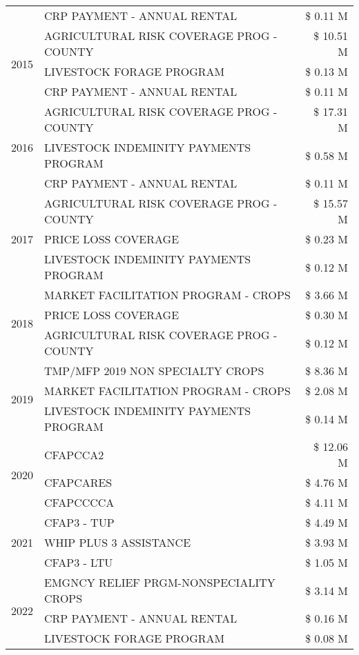 \begin{tabular}{llr}
 & CRP PAYMENT - ANNUAL RENTAL & \$ 0.11 M \\
\cline{1-3}
\multirow[t]{3}{*}{2015} & AGRICULTURAL RISK COVERAGE PROG - COUNTY & \$ 10.51 M \\
 & LIVESTOCK FORAGE PROGRAM & \$ 0.13 M \\
 & CRP PAYMENT - ANNUAL RENTAL & \$ 0.11 M \\
\cline{1-3}
\multirow[t]{3}{*}{2016} & AGRICULTURAL RISK COVERAGE PROG - COUNTY & \$ 17.31 M \\
 & LIVESTOCK INDEMINITY PAYMENTS PROGRAM & \$ 0.58 M \\
 & CRP PAYMENT - ANNUAL RENTAL & \$ 0.11 M \\
\cline{1-3}
\multirow[t]{3}{*}{2017} & AGRICULTURAL RISK COVERAGE PROG - COUNTY & \$ 15.57 M \\
 & PRICE LOSS COVERAGE & \$ 0.23 M \\
 & LIVESTOCK INDEMINITY PAYMENTS PROGRAM & \$ 0.12 M \\
\cline{1-3}
\multirow[t]{3}{*}{2018} & MARKET FACILITATION PROGRAM - CROPS & \$ 3.66 M \\
 & PRICE LOSS COVERAGE & \$ 0.30 M \\
 & AGRICULTURAL RISK COVERAGE PROG - COUNTY & \$ 0.12 M \\
\cline{1-3}
\multirow[t]{3}{*}{2019} & TMP/MFP 2019 NON SPECIALTY CROPS & \$ 8.36 M \\
 & MARKET FACILITATION PROGRAM - CROPS & \$ 2.08 M \\
 & LIVESTOCK INDEMINITY PAYMENTS PROGRAM & \$ 0.14 M \\
\cline{1-3}
\multirow[t]{3}{*}{2020} & CFAPCCA2 & \$ 12.06 M \\
 & CFAPCARES & \$ 4.76 M \\
 & CFAPCCCCA & \$ 4.11 M \\
\cline{1-3}
\multirow[t]{3}{*}{2021} & CFAP3 - TUP & \$ 4.49 M \\
 & WHIP PLUS 3 ASSISTANCE & \$ 3.93 M \\
 & CFAP3 - LTU & \$ 1.05 M \\
\cline{1-3}
\multirow[t]{3}{*}{2022} & EMGNCY RELIEF PRGM-NONSPECIALITY CROPS & \$ 3.14 M \\
 & CRP PAYMENT - ANNUAL RENTAL & \$ 0.16 M \\
 & LIVESTOCK FORAGE PROGRAM & \$ 0.08 M \\
\cline{1-3}
\bottomrule
\end{tabular}

